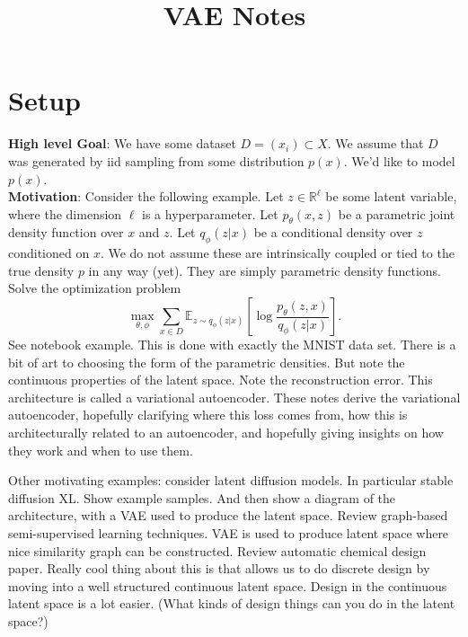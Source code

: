 \documentclass{article}
\title{VAE Notes}
\author{}
\date{}
\newcommand{\R}{\mathbb{R}}
\newcommand{\E}{\mathbb{E}}
\begin{document}
\maketitle


\section{Setup}

\noindent \textbf{High level Goal}: We have some dataset $D= (x_i)\subset X$. We assume that $D$ was generated by iid sampling from some distribution $p(x)$. We'd like to model $p(x)$. \\

\noindent \textbf{Motivation}:
Consider the following example. Let $z\in \R^\ell$ be some latent variable, where the dimension $\ell$ is a hyperparameter. Let $p_\theta(x, z)$ be a parametric joint density function over $x$ and $z$. Let $q_\phi(z|x)$ be a conditional density over $z$ conditioned on $x$. We do not assume these are intrinsically coupled or tied to the true density $p$ in any way (yet). They are simply parametric density functions. Solve the optimization problem
\begin{equation} 
\max_{\theta, \phi} \sum_{x\in D} \E_{z\sim q_{\phi}(z|x)}\left[ \log \frac{p_\theta(z, x)}{q_\phi(z|x)} \right].
\end{equation}
See notebook example. This is done with exactly the MNIST data set. There is a bit of art to choosing the form of the parametric densities. But note the continuous properties of the latent space. Note the reconstruction error. This architecture is called a variational autoencoder. These notes derive the variational autoencoder, hopefully clarifying where this loss comes from, how this is architecturally related to an autoencoder, and hopefully giving insights on how they work and when to use them. 

Other motivating examples: consider latent diffusion models. In particular stable diffusion XL. Show example samples. And then show a diagram of the architecture, with a VAE used to produce the latent space.  Review graph-based semi-supervised learning techniques. VAE is used to produce latent space where nice similarity graph can be constructed. Review automatic chemical design paper. Really cool thing about this is that allows us to do discrete design by moving into a well structured continuous latent space. Design in the continuous latent space is a lot easier. (What kinds of design things can you do in the latent space?) 
\end{document}
